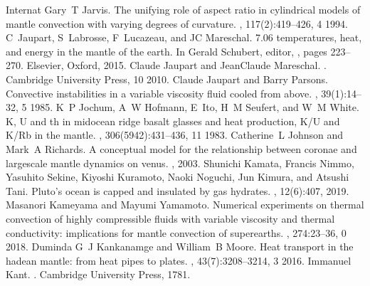 \documentclass[letterpaper,10pt,english]{jupyterBook}
\begin{document}
\begin{sphinxthebibliography}{Internat}
\sphinxAtStartPar
Gary T Jarvis. The unifying role of aspect ratio in cylindrical models of mantle convection with varying degrees of curvature. , 117(2):419–426, 4 1994.
\sphinxAtStartPar
C Jaupart, S Labrosse, F Lucazeau, and J\sphinxhyphen{}C Mareschal. 7.06 \sphinxhyphen{} temperatures, heat, and energy in the mantle of the earth. In Gerald Schubert, editor, , pages 223–270. Elsevier, Oxford, 2015.
\sphinxAtStartPar
Claude Jaupart and Jean\sphinxhyphen{}Claude Mareschal. . Cambridge University Press, 10 2010.
\sphinxAtStartPar
Claude Jaupart and Barry Parsons. Convective instabilities in a variable viscosity fluid cooled from above. , 39(1):14–32, 5 1985.
\sphinxAtStartPar
K P Jochum, A W Hofmann, E Ito, H M Seufert, and W M White. K, U and th in mid\sphinxhyphen{}ocean ridge basalt glasses and heat production, K/U and K/Rb in the mantle. , 306(5942):431–436, 11 1983.
\sphinxAtStartPar
Catherine L Johnson and Mark A Richards. A conceptual model for the relationship between coronae and large\sphinxhyphen{}scale mantle dynamics on venus. , 2003.
\sphinxAtStartPar
Shunichi Kamata, Francis Nimmo, Yasuhito Sekine, Kiyoshi Kuramoto, Naoki Noguchi, Jun Kimura, and Atsushi Tani. Pluto's ocean is capped and insulated by gas hydrates. , 12(6):407, 2019.
\sphinxAtStartPar
Masanori Kameyama and Mayumi Yamamoto. Numerical experiments on thermal convection of highly compressible fluids with variable viscosity and thermal conductivity: implications for mantle convection of super\sphinxhyphen{}earths. , 274:23–36, 0 2018.
\sphinxAtStartPar
Duminda G J Kankanamge and William B Moore. Heat transport in the hadean mantle: from heat pipes to plates. , 43(7):3208–3214, 3 2016.
\sphinxAtStartPar
Immanuel Kant. . Cambridge University Press, 1781.
\sphinxAtStartPar

\end{sphinxthebibliography}
\end{document}
